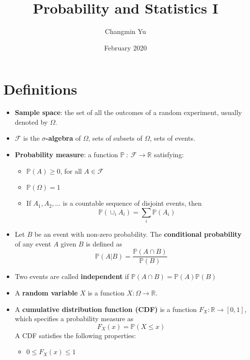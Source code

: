\documentclass{article}
\title{Probability and Statistics I}
\author{Changmin Yu}
\date{February 2020}
\begin{document}
\maketitle
\section{Definitions}
\begin{itemize}
    \item \textbf{Sample space}: the set of all the outcomes of a random experiment, usually
denoted by $\Omega$.
    \item $\mathcal{F}$ is the \textbf{$\sigma$-algebra} of $\Omega$, sets of subsets of $\Omega$, sets of events.
    \item \textbf{Probability measure}: a function $\mathbb{P}\ :\ \mathcal{F} \rightarrow \mathbb{R}$ satisfying:
    \begin{itemize}
        \item $\mathbb{P}(A) \geq 0$, for all $A \in \mathcal{F}$
        \item $\mathbb{P}(\Omega) = 1$
        \item If $A_1, A_2, ...$ is a countable sequence of disjoint events, then
        \begin{equation}
            \mathbb{P}(\cup_i A_i) = \sum_i \mathbb{P}(A_i)
        \end{equation}
    \end{itemize}
    \item Let $B$ be an event with non-zero probability. The \textbf{conditional probability} of any event $A$ given $B$ is defined as
    \begin{equation}
        \mathbb{P}(A|B) = \frac{\mathbb{P}(A \cap B)}{\mathbb{P}(B)}
    \end{equation}
    \item Two events are called \textbf{independent} if $\mathbb{P}(A \cap B) = \mathbb{P}(A)\mathbb{P}(B)$
    \item A \textbf{random variable} $X$ is a function $X : \Omega \rightarrow \mathbb{R}$.
    \item A \textbf{cumulative distribution function (CDF)} is a function $F_X : \mathbb{R} \rightarrow [0, 1]$, which specifies a probability measure as
    \begin{equation}
        F_X(x) = \mathbb{P}(X \leq x)
    \end{equation}
    A CDF satisfies the following properties:
    \begin{itemize}
        \item $0 \leq F_X(x) \leq 1$

\end{itemize}
\end{itemize}
\end{document}
